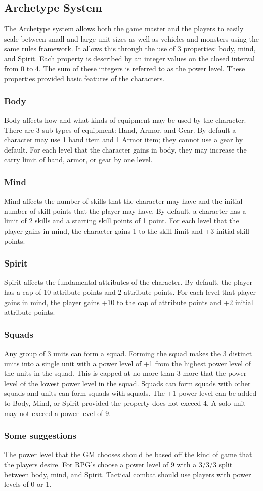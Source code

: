 \subsection{Archetype System}
The Archetype system allows both the game master and the players to easily
scale between small and large unit sizes as well as vehicles and monsters using
the same rules framework. It allows this through the use of 3 properties: body,
mind, and Spirit.  Each property is described by an integer values on the closed
interval from 0 to 4.  The sum of these integers is referred to as the power
level.  These properties provided basic features of the characters.
\subsubsection{Body}
Body affects how and what kinds of equipment may be used by the character.
There are 3 sub types of equipment: Hand, Armor, and Gear.  By default a
character may use 1 hand item and 1 Armor item;  they cannot use a gear by
default.  For each level that the character gains in body, they may increase the
carry limit of hand, armor, or gear by one level.
\subsubsection{Mind}
Mind affects the number of skills that the character may have and the initial
number of skill points that the player may have.  By default, a character has a
limit of 2 skills and a starting skill points of 1 point.  For each level that
the player gains in mind, the character gains 1 to the skill limit and +3
initial skill points.
\subsubsection{Spirit}
Spirit affects the fundamental attributes of the character.  By default, the player
has a cap of 10 attribute points and 2 attribute points.  For each level that
player gains in mind, the player gains +10 to the cap of attribute points and +2
initial attribute points.
\subsubsection{Squads}
Any group of 3 units can form a squad.  Forming the squad makes the 3 distinct
units into a single unit with a power level of +1 from the highest power level
of the units in the squad.  This is capped at no more than 3 more that the power
level of the lowest  power level in the squad.  Squads can form squads with
other squads and units can form squads with squads.  The +1 power level can be
added to Body, Mind, or Spirit provided the property does not exceed 4.  A solo
unit may not exceed a power level of 9.
\subsubsection{Some suggestions}
The power level that the GM chooses should be based off the kind of game that
the players desire.  For RPG's choose a power level of 9 with a 3/3/3 split
between body, mind, and Spirit. Tactical combat should use players with power
levels of 0 or 1.
